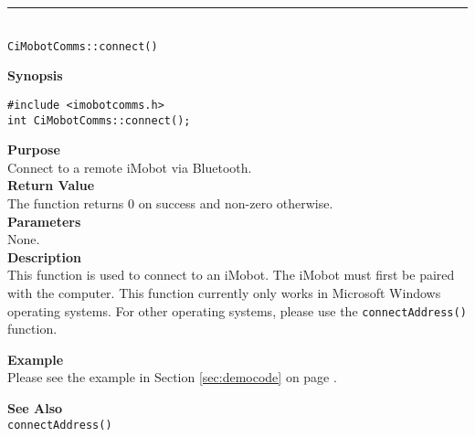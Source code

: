 \noindent
\vspace{5pt}
\rule{4.5in}{0.015in}\\
\noindent
{\LARGE \texttt{CiMobotComms::connect()}}\\
{}

\noindent
{\bf Synopsis}\\
\begin{verbatim}
#include <imobotcomms.h>
int CiMobotComms::connect();
\end{verbatim}

\noindent
{\bf Purpose}\\
Connect to a remote iMobot via Bluetooth.\\

\noindent
{\bf Return Value}\\
The function returns 0 on success and non-zero otherwise.\\

\noindent
{\bf Parameters}\\
None.\\

\noindent
{\bf Description}\\
This function is used to connect to an iMobot. The iMobot must first be paired
with the computer. This function currently only works in Microsoft Windows
operating systems. For other operating systems, please use the
\texttt{connectAddress()} function.

\noindent
{\bf Example}\\
Please see the example in Section \ref{sec:democode} on page \pageref{sec:democode}.\\
\noindent

\noindent
{\bf See Also}\\
\texttt{connectAddress()}

